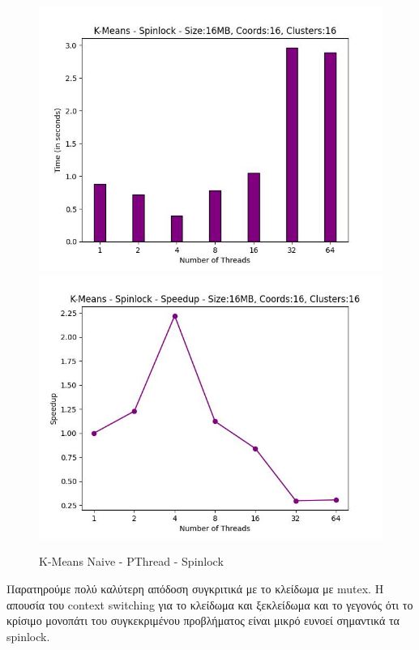 \documentclass[../final_report.tex]{subfiles}
\begin{document}
\begin{figure}[H]
    \centering
        \includegraphics[scale=0.48]{outFilesAffinityMouliko/plots/kmeans_locks_pthread_spin.jpg}
        \includegraphics[scale=0.48]{outFilesAffinityMouliko/plots/kmeans_locks_pthread_spin_speedup.jpg}
    \caption{K-Means Naive - PThread - Spinlock}
    \label{fig:K-Means Naive - PThread - Spinlock}
\end{figure}

Παρατηρούμε πολύ καλύτερη απόδοση συγκριτικά με το κλείδωμα με mutex. Η απουσία του context switching για το κλείδωμα και ξεκλείδωμα και 
το γεγονός ότι το κρίσιμο μονοπάτι του συγκεκριμένου προβλήματος είναι μικρό ευνοεί σημαντικά τα spinlock.
\end{document}
